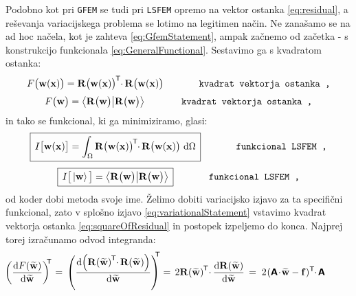 Podobno kot pri \texttt{GFEM} se tudi pri \texttt{LSFEM} opremo na vektor ostanka \eqref{eq:residual}, a reševanja variacijskega problema se lotimo na legitimen način. Ne zanašamo se na ad hoc načela, kot je zahteva \eqref{eq:GfemStatement}, ampak začnemo od začetka - s konstrukcijo funkcionala \eqref{eq:GeneralFunctional}. Sestavimo ga s kvadratom ostanka:
\begin{equation}
	F\big(\mathbf{w(x)}\big)
	=
	\mathbf{R\big(w(x)\big)}^\mathsf{\mkern-1mu T} \mkern-5mu \cdot \mkern-1mu \mathbf{R\big(w(x)\big)} \hspace{1.3cm} \texttt{kvadrat vektorja ostanka ,}
	\label{eq:squareOfResidual}
\end{equation}
\begin{equation}
	F\big(\mathbf{w}\big)
	=
	\bra{\mathbf{R\big(w\big)}}\ket{\mathbf{R\big(w\big)}} \hspace{1.3cm} \texttt{kvadrat vektorja ostanka ,}
	\label{eq:squareOfResidual}
\end{equation}
in tako se funkcional, ki ga minimiziramo, glasi:
\begin{equation}
	\boxed{
		\, I\big[\mathbf{w(x)}\big]
		=
		\int_{\Omega} \mathbf{R\big(w(x)\big)}^\mathsf{\mkern-2mu T} \mkern-5mu \cdot \mkern-1mu \mathbf{R\big(w(x)\big)} \ \mathrm{d} \Omega \,
	}
	\hspace{1.3cm} \texttt{funkcional LSFEM ,}
\end{equation}
\begin{equation}
	\boxed{
		\, I\big[\ket{\mathbf{w}}\big]
		=
		\bra{\mathbf{R\big(w\big)}}\ket{\mathbf{R\big(w\big)}} \,
	}
	\hspace{1.3cm} \texttt{funkcional LSFEM ,}
\end{equation}
od koder dobi metoda svoje ime. Želimo dobiti variacijsko izjavo za ta specifični funkcional, zato v splošno izjavo \eqref{eq:variationalStatement} vstavimo kvadrat vektorja ostanka \eqref{eq:squareOfResidual} in postopek izpeljemo do konca. Najprej torej izračunamo odvod integranda:
\begin{equation*}
	\hspace{-10mm}
	\left(\frac{\ud F(\widetilde{\mathbf{w}})}{\ud \widetilde{\mathbf{w}}}\right)^\mathsf{\mkern-7mu T}
	\mkern1mu = \,
	\left(\frac{\ud \! \left(\mathbf{R(\widetilde{w})}^\mathsf{\mkern-1mu T} \mkern-5mu \cdot \mkern-1mu \mathbf{R(\widetilde{w})}\right)}{\ud \mathbf{\widetilde{w}}}\right)^\mathsf{\mkern-10mu T}
	= \mkern3mu
	2 \mathbf{R(\widetilde{w})}^\mathsf{\mkern-1mu T} \mkern-4mu \cdot \mkern-1mu \frac{\ud \mathbf{R(\widetilde{w})}}{\ud \mathbf{\widetilde{w}}}
	\, = \mkern5mu
	2 \mkern1mu (\mathbsf{A} \! \cdot \! \mathbf{\widetilde{w}} - \mathbf{f})^\mathsf{T} \mkern-5mu \cdot \mkern-2mu \mathbsf{A}
\end{equation*}
